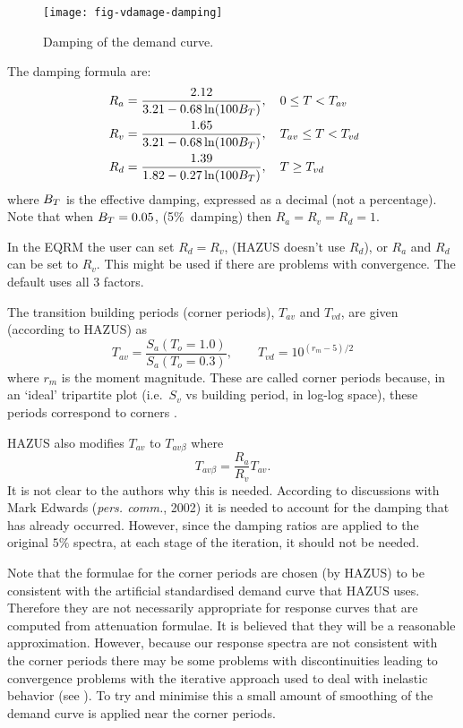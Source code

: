 \begin{figure}[htp]
\centering
{}
\texttt{[image: fig-vdamage-damping]}
\caption{Damping of the demand curve.}
\label{fig:v-dam-damping-adrs}
\end{figure}


The damping formula are:
\begin{align}
 R_a &= \frac{2.12}{3.21-0.68\ln(100\Beff)}, \quad 0\le T < T_{av}\\
\hspace{0.3em}
 R_v &= \frac{1.65}{3.21-0.68\ln(100\Beff)}, \quad T_{av}\le T < T_{vd}\\
\hspace{0.3em}
 R_d &= \frac{1.39}{1.82-0.27\ln(100\Beff)}, \quad T \ge T_{vd}
\end{align}
where $\Beff$ is the effective damping,
expressed as a decimal (not a percentage). Note that when $\Beff =
0.05$, (5\%\ damping) then $R_a=R_v=R_d=1$.

In the EQRM the user can set $R_d=R_v$, (HAZUS doesn't use $R_d$), or
$R_a$ and $R_d$ can be set to $R_v$. This might
be used if there are problems with convergence. The default
 uses all 3 factors.


The transition building periods (corner periods), $T_{av}$ and $T_{vd}$,
are given (according to HAZUS) as
\begin{equation}
 T_{av} = \frac{S_a(T_o =1.0)}{S_a(T_o =0.3)},
\qquad
 T_{vd} = 10^{(r_m-5)/2}
\end{equation}
where $r_m$ is the moment magnitude. These are called corner
periods because, in an `ideal' tripartite plot (i.e.~$S_v$ vs
building period, in log-log space), these periods correspond to
corners \citep{Newmark82}.

HAZUS also modifies $T_{av}$ to $T_{av\beta}$ where
$$
 T_{av\beta} = \frac{R_a}{R_v}T_{av}.
$$
It is not clear to the authors why this is needed. According to
discussions with Mark Edwards (\textit{pers. comm.}, 2002) it is
needed to account for the damping that has already occurred.
However, since the damping ratios are applied to the original
$5\%$ spectra, at each stage of the iteration, it should not be
needed.

Note that the formulae for the corner periods are chosen (by
HAZUS) to be consistent with the artificial standardised demand
curve that HAZUS uses. Therefore they are not
necessarily appropriate for response curves that are computed from
attenuation formulae. It is believed that they will be a
reasonable approximation. However, because our response spectra
are not consistent with the corner periods there may be some
problems with discontinuities leading to convergence problems with
the iterative approach used to deal with inelastic behavior (see
). To try and minimise this a small
amount of smoothing of the demand curve is
applied near the corner periods.

